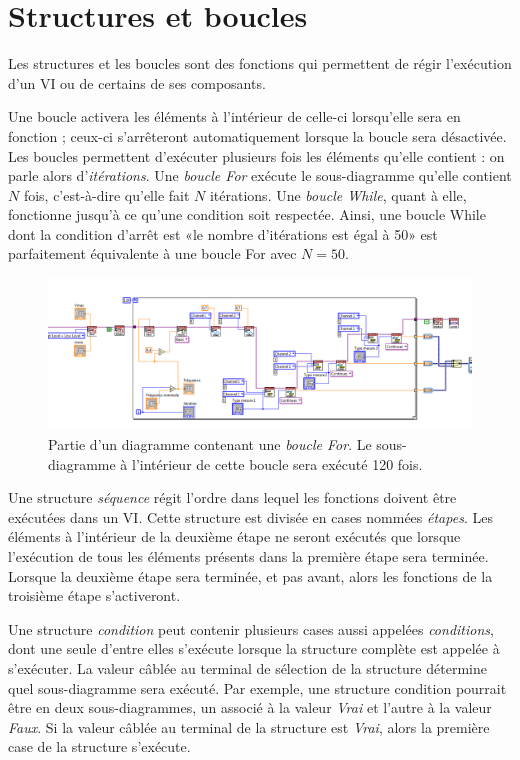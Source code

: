 \documentclass[12pt,oneside,letterpaper]{article}
\begin{document}
\section{Structures et boucles}

Les structures et les boucles sont des fonctions qui permettent de régir l'exécution d'un VI ou de certains de ses composants.

Une boucle activera les éléments à l'intérieur de celle-ci lorsqu'elle sera en fonction ; ceux-ci s'arrêteront automatiquement lorsque la boucle sera désactivée. Les boucles permettent d'exécuter plusieurs fois les éléments qu'elle contient : on parle alors d'\textit{itérations}. Une \textit{boucle For} exécute le sous-diagramme qu'elle contient $N$ fois, c'est-à-dire qu'elle fait $N$ itérations. Une \textit{boucle While}, quant à elle, fonctionne jusqu'à ce qu'une condition soit respectée. Ainsi, une boucle While dont la condition d'arrêt est «le nombre d'itérations est égal à 50» est parfaitement équivalente à une boucle For avec $N=50$.

\begin{figure}[h]
\includegraphics[width=\textwidth]{A classer/LabVIEW-2.png}
\caption{\label{Pauling}Partie d'un diagramme contenant une \textit{boucle For}. Le sous-diagramme à l'intérieur de cette boucle sera exécuté 120 fois.}
\end{figure}

Une structure \textit{séquence} régit l'ordre dans lequel les fonctions doivent être exécutées dans un VI. Cette structure est divisée en cases nommées \textit{étapes}. Les éléments à l'intérieur de la deuxième étape ne seront exécutés que lorsque l'exécution de tous les éléments présents dans la première étape sera terminée. Lorsque la deuxième étape sera terminée, et pas avant, alors les fonctions de la troisième étape s'activeront.

Une structure \textit{condition} peut contenir plusieurs cases aussi appelées \textit{conditions}, dont une seule d'entre elles s'exécute lorsque la structure complète est appelée à s'exécuter. La valeur câblée au terminal de sélection de la structure détermine quel sous-diagramme sera exécuté. Par exemple, une structure condition pourrait être en deux sous-diagrammes, un associé à la valeur \textit{Vrai} et l'autre à la valeur \textit{Faux}. Si la valeur câblée au terminal de la structure est \textit{Vrai}, alors la première case de la structure s'exécute.
\end{document}
